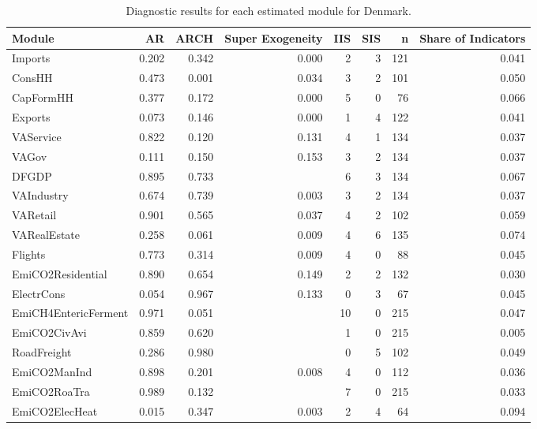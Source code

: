 \begin{table}
\centering
\caption{\label{tab:DK_diagnostics}Diagnostic results for each estimated module for Denmark.}
\centering
\begin{tabular}[t]{lrrrrrrr}
\toprule
Module & AR & ARCH & Super Exogeneity & IIS & SIS & n & Share of Indicators\\
\midrule
Imports & 0.202 & 0.342 & 0.000 & 2 & 3 & 121 & 0.041\\
ConsHH & 0.473 & 0.001 & 0.034 & 3 & 2 & 101 & 0.050\\
CapFormHH & 0.377 & 0.172 & 0.000 & 5 & 0 & 76 & 0.066\\
Exports & 0.073 & 0.146 & 0.000 & 1 & 4 & 122 & 0.041\\
VAService & 0.822 & 0.120 & 0.131 & 4 & 1 & 134 & 0.037\\
\addlinespace
VAGov & 0.111 & 0.150 & 0.153 & 3 & 2 & 134 & 0.037\\
DFGDP & 0.895 & 0.733 &  & 6 & 3 & 134 & 0.067\\
VAIndustry & 0.674 & 0.739 & 0.003 & 3 & 2 & 134 & 0.037\\
VARetail & 0.901 & 0.565 & 0.037 & 4 & 2 & 102 & 0.059\\
VARealEstate & 0.258 & 0.061 & 0.009 & 4 & 6 & 135 & 0.074\\
\addlinespace
Flights & 0.773 & 0.314 & 0.009 & 4 & 0 & 88 & 0.045\\
EmiCO2Residential & 0.890 & 0.654 & 0.149 & 2 & 2 & 132 & 0.030\\
ElectrCons & 0.054 & 0.967 & 0.133 & 0 & 3 & 67 & 0.045\\
EmiCH4EntericFerment & 0.971 & 0.051 &  & 10 & 0 & 215 & 0.047\\
EmiCO2CivAvi & 0.859 & 0.620 &  & 1 & 0 & 215 & 0.005\\
\addlinespace
RoadFreight & 0.286 & 0.980 &  & 0 & 5 & 102 & 0.049\\
EmiCO2ManInd & 0.898 & 0.201 & 0.008 & 4 & 0 & 112 & 0.036\\
EmiCO2RoaTra & 0.989 & 0.132 &  & 7 & 0 & 215 & 0.033\\
EmiCO2ElecHeat & 0.015 & 0.347 & 0.003 & 2 & 4 & 64 & 0.094\\
\bottomrule
\end{tabular}
\end{table}
